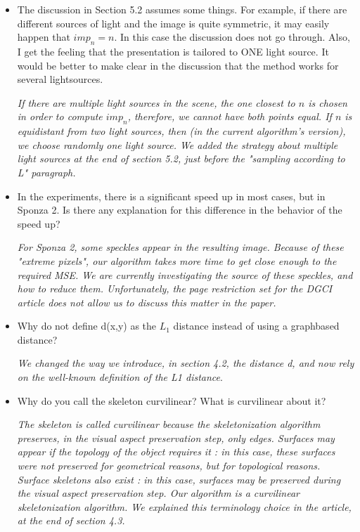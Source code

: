 \documentclass[final,envcountsame]{article}
\begin{document}
\begin{itemize}

\item The discussion in Section 5.2 assumes some things. For example, if there are different sources of light and the image is quite symmetric, it may easily happen that $imp_n=n$. In this case the discussion does not go through.
Also, I get the feeling that the presentation is tailored to ONE light source. It would be better to make clear in the discussion that the method works for several light­sources.

\textit{If there are multiple light sources in the scene, the one closest to $n$ is chosen in order to compute $imp_n$, therefore, we cannot have both points equal. If $n$ is equidistant from two light sources, then (in the current algorithm's version), we choose randomly one light source.
We added the strategy about multiple light sources at the end of section 5.2, just before the "sampling according to L" paragraph.}


\item In the experiments, there is a significant speed up in most cases, but in Sponza 2. Is there any explanation for this difference in the behavior of the speed up?

\textit{For Sponza 2, some speckles appear in the resulting image. Because of these "extreme pixels", our algorithm takes more time to get close enough to the required MSE. We are currently investigating the source of these speckles, and how to reduce them. Unfortunately, the page restriction set for the DGCI article does not allow us to discuss this matter in the paper.}\\


\item Why do not define d(x,y) as the $L_1$ ­distance instead of using a graph­based distance?

\textit{We changed the way we introduce, in section 4.2, the distance d, and now rely on the well-known definition of the L1 distance}.\\


\item Why do you call the skeleton curvilinear? What is curvilinear about it?

\textit{The skeleton is called curvilinear because the skeletonization algorithm preserves, in the visual aspect preservation step, only edges. Surfaces may appear if the topology of the object requires it : in this case, these surfaces were not preserved for geometrical reasons, but for topological reasons. Surface skeletons also exist : in this case, surfaces may be preserved during the visual aspect preservation step. Our algorithm is a curvilinear skeletonization algorithm.
We explained this terminology choice in the article, at the end of section 4.3.}\\



\end{itemize}
\end{document}
